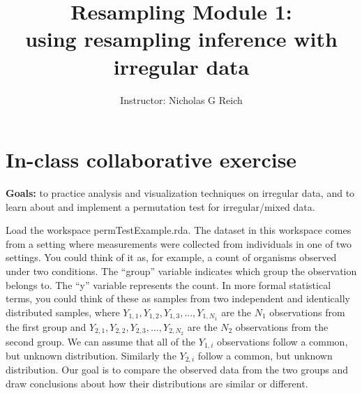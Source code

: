 \documentclass[11pt]{article}\usepackage{graphicx, color}
\title{Resampling Module 1: \\ using resampling inference with irregular data}
\author{%
Instructor: Nicholas G Reich}
\date{}
\begin{document}
\maketitle


\section*{In-class collaborative exercise}
{\bf Goals:} to practice analysis and visualization techniques on irregular data, and to learn about and implement a permutation test for irregular/mixed data.

Load the workspace permTestExample.rda. The dataset in this workspace comes from a setting where measurements were collected from individuals in one of two settings. You could think of it as, for example, a count of organisms observed under two conditions. The ``group'' variable indicates which group the observation belongs to. The ``y'' variable represents the count. In more formal statistical terms, you could think of these as samples from two independent and identically distributed samples, where $Y_{1,1}, Y_{1,2}, Y_{1,3} , ..., Y_{1,N_1}$ are the $N_1$ observations from the first group and $Y_{2,1}, Y_{2,2}, Y_{2,3} , ..., Y_{2,N_2}$ are the $N_2$ observations from the second group. We can assume that all of the $Y_{1,i}$ observations follow a common, but unknown distribution. Similarly the $Y_{2,i}$ follow a common, but unknown distribution. Our goal is to compare the observed data from the two groups and draw conclusions about how their distributions are similar or different.
\end{document}
